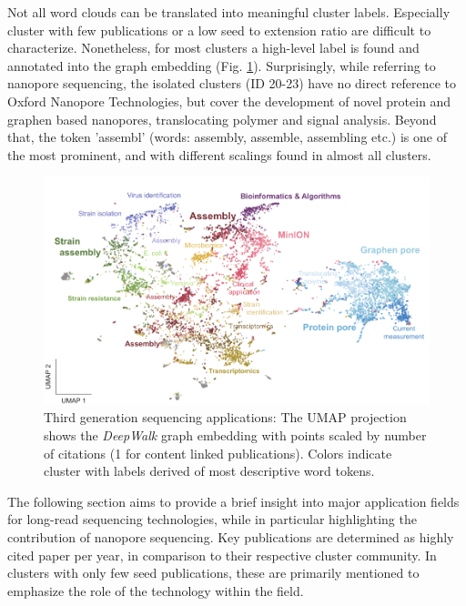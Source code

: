 Not all word clouds can be translated into meaningful cluster labels.
Especially cluster with few publications or a low seed to extension ratio are difficult to characterize.
Nonetheless, for most clusters a high-level label is found and annotated into the graph embedding (Fig. \ref{fig:state_of_art:umap_cluster}).
Surprisingly, while referring to nanopore sequencing, the isolated clusters (ID 20-23) have no direct reference to Oxford Nanopore Technologies, but cover the development of novel protein and graphen based nanopores, translocating polymer and signal analysis.
Beyond that, the token 'assembl' (words: assembly, assemble, assembling etc.) is one of the most prominent, and with different scalings found in almost all clusters.

\begin{figure}[h]
	\centering
	\includegraphics[width=1.0\textwidth]{figures/state_of_art/umap_cluster.pdf}
	\captionsetup{format=plain}
	\caption[Third generation sequencing applications]{Third generation sequencing applications: The UMAP projection shows the \textit{DeepWalk} graph embedding with points scaled by number of citations (1 for content linked publications). Colors indicate cluster with labels derived of most descriptive word tokens.}
	\label{fig:state_of_art:umap_cluster}
\end{figure}

The following section aims to provide a brief insight into major application fields for long-read sequencing technologies, while in particular highlighting the contribution of nanopore sequencing.
Key publications are determined as highly cited paper per year, in comparison to their respective cluster community.
In clusters with only few seed publications, these are primarily mentioned to emphasize the role of the technology within the field.

